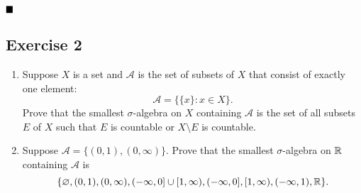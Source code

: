 $\qed$

\subsection{Exercise 2}

\begin{formulationBox}
	\begin{enumerate}[label=\alph*)]
		\item Suppose $X$ is a set and $\mathcal{A}$ is the set of subsets of $X$ that consist of exactly one element: \[\mathcal{A} = \{\{x\}:x\in X\}.\]
		Prove that the smallest $\sigma$-algebra on $X$ containing $\mathcal{A}$ is the set of all subsets $E$ of $X$ such that $E$ is countable or $X\setminus E$ is countable.
		
		\item Suppose $\mathcal{A} = \{(0,1), (0,\infty)\}$. Prove that the smallest $\sigma$-algebra on $\mathbb{R}$ containing $\mathcal{A}$ is \[\{\varnothing, (0,1), (0,\infty), (-\infty,0]\cup[1,\infty), (-\infty, 0], [1,\infty), (-\infty,1), \mathbb{R}\}.\]
	\end{enumerate}
\end{formulationBox}

